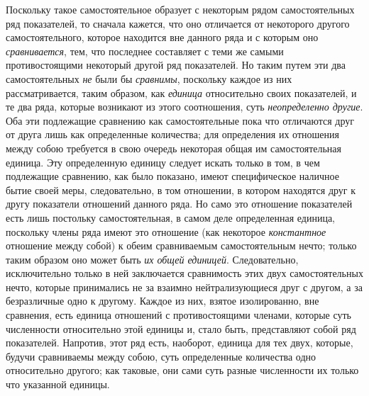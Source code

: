 Поскольку такое самостоятельное образует с некоторым рядом самостоятельных ряд
показателей, то сначала кажется, что оно отличается от некоторого другого
самостоятельного, которое находится вне данного ряда и с которым оно
{\em сравнивается}, тем, что последнее составляет с теми же самыми
противостоящими некоторый другой ряд показателей. Но таким путем эти два
самостоятельных {\em не} были бы {\em сравнимы}, поскольку каждое из них
рассматривается, таким образом, как {\em единица} относительно своих
показателей, и те два ряда, которые возникают из этого соотношения, суть
{\em неопределенно другие}. Оба эти подлежащие сравнению как самостоятельные
пока что отличаются друг от друга лишь как определенные количества; для
определения их отношения между собою требуется в свою очередь некоторая общая
им самостоятельная единица. Эту определенную единицу следует искать только в
том, в чем подлежащие сравнению, как было показано, имеют специфическое
наличное бытие своей меры, следовательно, в том отношении, в котором находятся
друг к другу показатели отношений данного ряда. Но само это отношение
показателей есть лишь постольку самостоятельная, в самом деле определенная
единица, поскольку члены ряда имеют это отношение (как некоторое
{\em константное} отношение между собой) к обеим сравниваемым самостоятельным
нечто; только таким образом оно может быть {\em их общей единицей}.
Следовательно, исключительно только в ней заключается сравнимость этих двух
самостоятельных нечто, которые принимались не за взаимно нейтрализующиеся друг
с другом, а за безразличные одно к другому. Каждое из них, взятое изолированно,
вне сравнения, есть единица отношений с противостоящими членами, которые суть
численности относительно этой единицы и, стало быть, представляют собой ряд
показателей. Напротив, этот ряд есть, наоборот, единица для тех двух, которые,
будучи сравниваемы между собою, суть определенные количества одно относительно
другого; как таковые, они сами суть разные численности их только что указанной
единицы.

